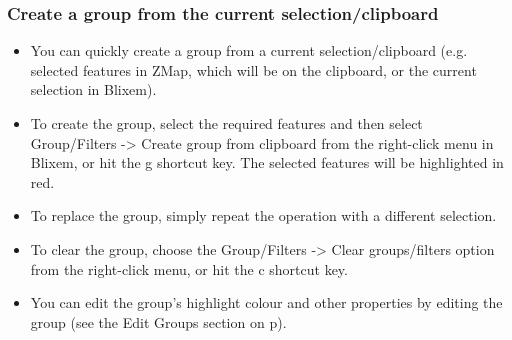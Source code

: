 \documentclass[letterpaper]{article}
\newcommand\liststyleWWviiiNumxvi{%
\renewcommand\labelitemi{{\textbullet}}
\renewcommand\labelitemii{o}
\renewcommand\labelitemiii{[F0A7?]}
\renewcommand\labelitemiv{[F0B7?]}
}
\begin{document}
{\color[rgb]{0.30980393,0.5058824,0.7411765}
\subsubsection[Create a group from the current selection/clipboard]{Create a group from the current selection/clipboard}}
\hypertarget{RefHeading2121056909880}{}\liststyleWWviiiNumxvi
\begin{itemize}
\item {You can quickly create a group from a current selection/clipboard (e.g. selected features in ZMap, which will be on the clipboard, or the current selection in Blixem).}
\item {To create the group, select the required features and then select {\textquotesingle}Group/Filters -> Create group from clipboard{\textquotesingle} from the right-click menu in Blixem, or hit the {\textquotesingle}g{\textquotesingle} shortcut key. The selected features will be highlighted in red.}
\item {To replace the group, simply repeat the operation with a different selection.}
\item {To clear the group, choose the {\textquotesingle}Group/Filters -> Clear groups/filters{\textquotesingle} option from the right-click menu, or hit the {\textquotesingle}c{\textquotesingle} shortcut key.}
\item {You can edit the group's highlight colour and other properties by editing the group (see the Edit Groups section on p\pageref{section:edit_group}).}
\end{itemize}
\end{document}
